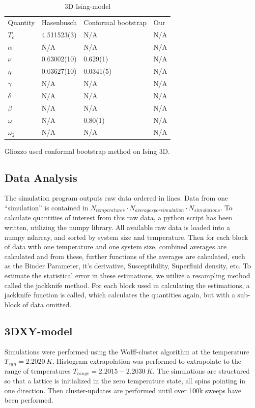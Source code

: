 \begin{table}[!htpb]
\begin{center}
\begin{tabular}{l l l l}
  Quantity  & Hasenbusch & Conformal bootstrap& Our\\
  $T_c$	    & 4.511523(3)& N/A		& N/A\\
  $\alpha $ & N/A        & N/A		& N/A\\
  $\nu	  $ & 0.63002(10)& 0.629(1)	& N/A\\
  $\eta   $ & 0.03627(10)& 0.0341(5)	& N/A\\
  $\gamma $ & N/A        & N/A		& N/A\\
  $\delta $ & N/A        & N/A		& N/A\\
  $\beta  $ & N/A        & N/A		& N/A\\
  $\omega $ & N/A        & 0.80(1)	& N/A\\
  $\omega_2$& N/A        & N/A		& N/A\\
\end{tabular}
\end{center}
\caption{3D Ising-model }
\end{table}
Gliozzo used conformal bootstrap method on Ising 3D.\cite{Gliozzi2014}


\subsection{Data Analysis}
The simulation program outputs raw data ordered in lines. Data from one ``simulation'' is contained in $N_{temperatures} \cdot N_{averages per simulation} \cdot N_{simulations}$.
To calculate quantities of interest from this raw data, a python script has been written, utilizing the numpy library. All available raw data is loaded into a numpy ndarray, and sorted by system size and temperature. Then for each block of data with one temperature and one system size, combined averages are calculated and from these, further functions of the averages are calculated, such as the Binder Parameter, it's derivative, Susceptibility, Superfluid density, etc. To estimate the statistical error in these estimations, we utilize a resampling method called the jackknife method. For each block used in calculating the estimations, a jackknife function is called, which calculates the quantities again, but with a sub-block of data omitted.
\subsection{3DXY-model}
Simulations were performed using the Wolff-cluster algorithm at the temperature $T_{run} = 2.2020~K$. Histogram extrapolation was performed to extrapolate to the range of temperatures $T_{range} = 2.2015-2.2030 ~ K$.
The simulations are structured so that a lattice is initialized in the zero temperature state, all spins pointing in one direction. Then cluster-updates are performed until over 100k sweeps have been performed.

